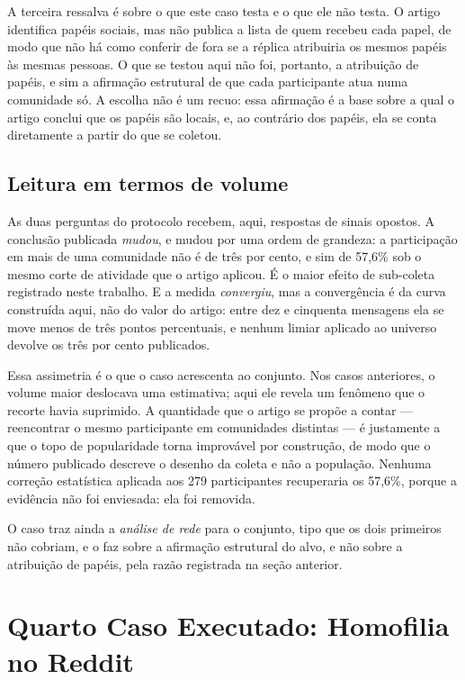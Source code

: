 A terceira ressalva é sobre o que este caso testa e o que ele não testa. O artigo
identifica papéis sociais, mas não publica a lista de quem recebeu cada papel, de
modo que não há como conferir de fora se a réplica atribuiria os mesmos papéis às
mesmas pessoas. O que se testou aqui não foi, portanto, a atribuição de papéis, e
sim a afirmação estrutural de que cada participante atua numa comunidade só. A
escolha não é um recuo: essa afirmação é a base sobre a qual o artigo conclui que
os papéis são locais, e, ao contrário dos papéis, ela se conta diretamente a partir
do que se coletou.

\section{Leitura em termos de volume}

As duas perguntas do protocolo recebem, aqui, respostas de sinais opostos. A conclusão
publicada \emph{mudou}, e mudou por uma ordem de grandeza: a participação em mais de uma
comunidade não é de três por cento, e sim de 57,6\% sob o mesmo corte de atividade que o
artigo aplicou. É o maior efeito de sub-coleta registrado neste trabalho. E a medida
\emph{convergiu}, mas a convergência é da curva construída aqui, não do valor do artigo:
entre dez e cinquenta mensagens ela se move menos de três pontos percentuais, e nenhum
limiar aplicado ao universo devolve os três por cento publicados.

Essa assimetria é o que o caso acrescenta ao conjunto. Nos casos anteriores, o volume
maior deslocava uma estimativa; aqui ele revela um fenômeno que o recorte havia
suprimido. A quantidade que o artigo se propõe a contar --- reencontrar o mesmo
participante em comunidades distintas --- é justamente a que o topo de popularidade
torna improvável por construção, de modo que o número publicado descreve o desenho da
coleta e não a população. Nenhuma correção estatística aplicada aos 279 participantes
recuperaria os 57,6\%, porque a evidência não foi enviesada: ela foi removida.

O caso traz ainda a \emph{análise de rede} para o conjunto, tipo que os dois primeiros
não cobriam, e o faz sobre a afirmação estrutural do alvo, e não sobre a atribuição de
papéis, pela razão registrada na seção anterior.

\chapter{Quarto Caso Executado: Homofilia no Reddit}
\label{cap:caso-homofilia}

